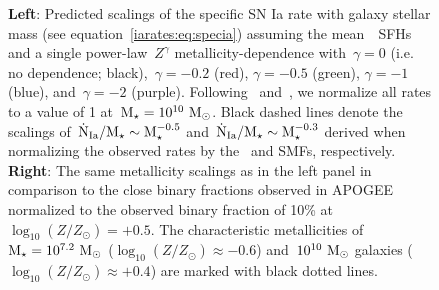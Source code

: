 {\begin{landscape}
\begin{figure}
\caption{
\textbf{Left}: Predicted scalings of the specific SN Ia rate with galaxy
stellar mass (see equation~\ref{iarates:eq:specia}) assuming the mean~\um~SFHs and a
single power-law~$Z^\gamma$ metallicity-dependence with~$\gamma = 0$ (i.e. no
dependence; black),~$\gamma = -0.2$ (red), $\gamma = -0.5$ (green),
$\gamma = -1$ (blue), and~$\gamma = -2$ (purple).
Following~\citet{Brown2019} and~\citet{Gandhi2022}, we normalize all rates to
a value of 1 at~$\text{M}_\star = 10^{10}~\text{M}_\odot$.
Black dashed lines denote the scalings of~$\dot{\text{N}}_\text{Ia} / \text{M}_\star
\sim \text{M}_\star^{-0.5}$ and~$\dot{\text{N}}_\text{Ia} / \text{M}_\star \sim \text{M}_\star^{-0.3}$
derived when normalizing the observed rates by the~\citet{Bell2003} and
\citet{Baldry2012} SMFs, respectively.
\textbf{Right}: The same metallicity scalings as in the left panel in
comparison to the close binary fractions observed in APOGEE
\citep[][black dashed line with error bars]{Moe2019} normalized to the observed
binary fraction of 10\% at~$\log_{10}(Z / Z_\odot) = +0.5$.
The characteristic metallicities of~$\text{M}_\star = 10^{7.2}~\text{M}_\odot$
($\log_{10}(Z / Z_\odot) \approx -0.6$) and~$10^{10}~\text{M}_\odot$ galaxies 
($\log_{10}(Z / Z_\odot) \approx +0.4$) are marked with black dotted lines.
}
\label{iarates:fig:specia_metdep}
\end{figure}
\end{landscape}
\clearpage
}

